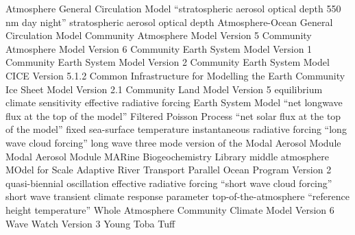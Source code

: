 \documentclass[draft]{agujournal2019}
\begin{document}
\begin{acronyms}
   Atmosphere General Circulation Model  ``stratospheric
  aerosol optical depth 550 nm day night''  stratospheric aerosol optical depth
   Atmosphere-Ocean General Circulation Model  Community Atmosphere
  Model Version 5  Community Atmosphere Model Version 6  Community
  Earth System Model Version 1  Community Earth System Model Version 2
   Community Earth System Model  CICE Version 5.1.2 
  Common Infrastructure for Modelling the Earth  Community Ice Sheet Model
  Version 2.1  Community Land Model Version 5  equilibrium climate
  sensitivity  effective radiative forcing  Earth System Model
   ``net longwave flux at the top of the model''  Filtered Poisson
  Process  ``net solar flux at the top of the model''  fixed
  sea-surface temperature  instantaneous radiative forcing  ``long
  wave cloud forcing''  long wave  three mode version of the Modal
  Aerosol Module  Modal Aerosol Module  MARine Biogeochemistry
  Library  middle atmosphere  MOdel for Scale Adaptive River
  Transport  Parallel Ocean Program Version 2  quasi-biennial
  oscillation  effective radiative forcing  ``short wave cloud
  forcing''  short wave  transient climate response parameter
   top-of-the-atmosphere  ``reference height temperature''
   Whole Atmosphere Community Climate Model Version 6  Wave Watch
  Version 3  Young Toba Tuff
\end{acronyms}

\end{document}
